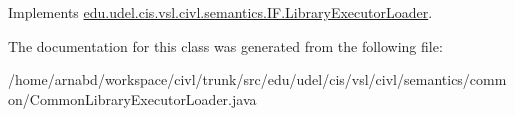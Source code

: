 Implements \hyperlink{interfaceedu_1_1udel_1_1cis_1_1vsl_1_1civl_1_1semantics_1_1IF_1_1LibraryExecutorLoader_aab5fd9b48e16c47ce5794b78957786d8}{edu.\+udel.\+cis.\+vsl.\+civl.\+semantics.\+I\+F.\+Library\+Executor\+Loader}.



The documentation for this class was generated from the following file\+:\begin{DoxyCompactItemize}
\item 
/home/arnabd/workspace/civl/trunk/src/edu/udel/cis/vsl/civl/semantics/common/Common\+Library\+Executor\+Loader.\+java\end{DoxyCompactItemize}
